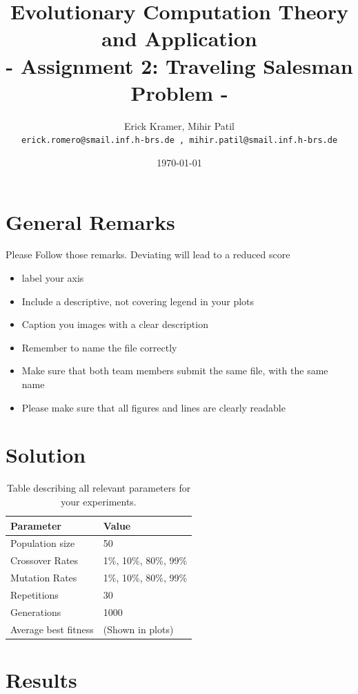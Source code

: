 \documentclass[a4paper, 12pt]{article}
\title{Evolutionary Computation Theory and Application  \\
				- Assignment 2: Traveling Salesman Problem -}
\author{\color{blue}Erick Kramer, Mihir Patil\\ \texttt{\color{blue}erick.romero@smail.inf.h-brs.de , mihir.patil@smail.inf.h-brs.de}}
\date{\today}
\begin{document}
\maketitle

\section{General Remarks }

Please Follow those remarks. Deviating will lead to a reduced score

\begin{itemize}
	\item label your axis 
	\item Include a descriptive, not covering legend in your plots
	\item Caption you images with a clear description
	\item Remember to name the file correctly
	\item Make sure that both team members submit the same file, with the same name
	\item Please make sure that all figures and lines are clearly readable
\end{itemize}
\newpage
\section{Solution}


\begin{table} [h!]
	  \centering
\begin{tabular}{|l|l|}
\hline
\textbf{Parameter} & \textbf{Value}   \\
\hline
Population size & 50 \\
\hline
Crossover Rates &  1\%, 10\%, 80\%, 99\% \\
\hline
Mutation Rates &  1\%, 10\%, 80\%, 99\% \\
\hline
Repetitions & 30 \\
\hline
Generations & 1000 \\
\hline
Average best fitness		 & (Shown in plots) \\
\hline
\end{tabular}
\caption{Table describing all relevant parameters for your experiments. }
\label{table:defparams}
\end{table}

\newpage
\section{Results}
\end{document}
